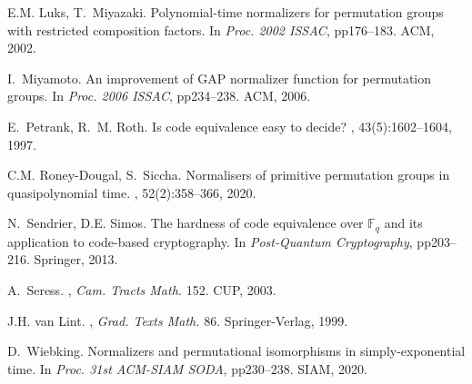 \documentclass[11pt,a4paper]{article}
\theoremstyle{definition}
\theoremstyle{remark}
\begin{document}
\begin{thebibliography}{10}
E.M. Luks, T.~Miyazaki.
\newblock Polynomial-time normalizers for permutation groups with restricted composition factors.
\newblock In {\em Proc. 2002 {ISSAC}}, pp176--183. ACM, 2002.

I.~Miyamoto.
\newblock An improvement of {GAP} normalizer function for permutation groups.
\newblock In {\em Proc. 2006 {ISSAC}}, pp234--238. ACM, 2006.

E.~Petrank, R.~M. Roth.
\newblock Is code equivalence easy to decide?
, 43(5):1602--1604, 1997.

C.M. Roney-Dougal, S.~Siccha.
\newblock Normalisers of primitive permutation groups in quasipolynomial time.
, 52(2):358--366, 2020.

N.~Sendrier, D.E. Simos.
\newblock The hardness of code equivalence over $\mathbb{F}_q$ and its
  application to code-based cryptography.
\newblock In {\em Post-Quantum Cryptography}, pp203--216. Springer, 2013.

A.~Seress.
,  {\em Cam. Tracts Math.} 152.
\newblock CUP, 2003.

J.H. van Lint.
, {\em Grad. Texts Math.} 86.
\newblock Springer-Verlag, 1999.

D.~Wiebking.
\newblock Normalizers and permutational isomorphisms in simply-exponential
  time.
\newblock In {\em Proc. 31st ACM-SIAM {SODA}}, pp230--238. SIAM, 2020.

\end{thebibliography}
\end{document}
